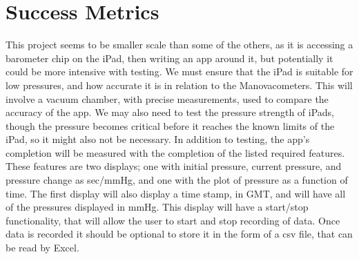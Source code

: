 \documentclass[onecolumn, draftclsnofoot,10pt, compsoc]{IEEEtran}
\begin{document}
\section{Success Metrics} 
This project seems to be smaller scale than some of the others, as it is accessing a barometer chip on the iPad, then writing an app around it, but potentially it could be more intensive with testing.
We must ensure that the iPad is suitable for low pressures, and how accurate it is in relation to the Manovacometers.
This will involve a vacuum chamber, with precise measurements, used to compare the accuracy of the app.
We may also need to test the pressure strength of iPads, though the pressure becomes critical before it reaches the known limits of the iPad, so it might also not be necessary.
In addition to testing, the app's completion will be measured with the completion of the listed required features.
These features are two displays; one with initial pressure, current pressure, and pressure change as sec/mmHg, and one with the plot of pressure as a function of time.
The first display will also display a time stamp, in GMT, and will have all of the pressures displayed in mmHg.
This display will have a start/stop functionality, that will allow the user to start and stop recording of data.
Once data is recorded it should be optional to store it in the form of a csv file, that can be read by Excel.
\end{document}
